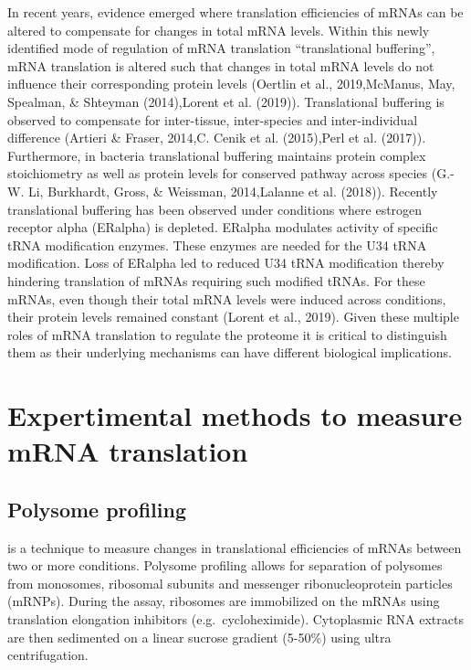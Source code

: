\documentclass[12pt,openany]{book}
\begin{document}
In recent years, evidence emerged where translation efficiencies of
mRNAs can be altered to compensate for changes in total mRNA levels.
Within this newly identified mode of regulation of mRNA translation
``translational buffering'', mRNA translation is altered such that
changes in total mRNA levels do not influence their corresponding
protein levels (Oertlin et al., 2019,McManus, May, Spealman, \& Shteyman
(2014),Lorent et al. (2019)). Translational buffering is observed to
compensate for inter-tissue, inter-species and inter-individual
difference (Artieri \& Fraser, 2014,C. Cenik et al. (2015),Perl et al.
(2017)). Furthermore, in bacteria translational buffering maintains
protein complex stoichiometry as well as protein levels for conserved
pathway across species (G.-W. Li, Burkhardt, Gross, \& Weissman,
2014,Lalanne et al. (2018)). Recently translational buffering has been
observed under conditions where estrogen receptor alpha (ERalpha) is
depleted. ERalpha modulates activity of specific tRNA modification
enzymes. These enzymes are needed for the U34 tRNA modification. Loss of
ERalpha led to reduced U34 tRNA modification thereby hindering
translation of mRNAs requiring such modified tRNAs. For these mRNAs,
even though their total mRNA levels were induced across conditions,
their protein levels remained constant (Lorent et al., 2019). Given
these multiple roles of mRNA translation to regulate the proteome it is
critical to distinguish them as their underlying mechanisms can have
different biological implications.

\section{Expertimental methods to measure mRNA translation}

\subsection{Polysome profiling}

is a technique to measure changes in translational efficiencies of mRNAs
between two or more conditions. Polysome profiling allows for separation
of polysomes from monosomes, ribosomal subunits and messenger
ribonucleoprotein particles (mRNPs). During the assay, ribosomes are
immobilized on the mRNAs using translation elongation inhibitors
(e.g.~cycloheximide). Cytoplasmic RNA extracts are then sedimented on a
linear sucrose gradient (5-50\%) using ultra centrifugation.
\end{document}
